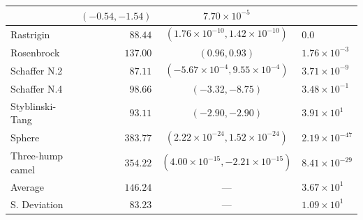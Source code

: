 \begin{longtable}{|l|r|c|l|}
                          & $(-0.54, -1.54)$	
                          & $7.70 \times 10^{-5}$\\\hline
        Rastrigin	        & $88.44$	
                          & $(1.76 \times 10^{-10}, 1.42 \times 10^{-10})$
                          & $0.0$\\\hline
        Rosenbrock	      & $137.00$	
                          & $(0.96, 0.93)$	
                          & $1.76 \times 10^{-3}$\\\hline
        Schaffer N.2	    & $87.11$	
                          & $(-5.67 \times 10^{-4}, 9.55 \times 10^{-4})$	
                          & $3.71 \times 10^{-9}$\\\hline
        Schaffer N.4	    & $98.66$	
                          & $(-3.32, -8.75)$	
                          & $3.48 \times 10^{-1}$\\\hline
        Styblinski-Tang	  & $93.11$	
                          & $(-2.90, -2.90)$	
                          & $3.91 \times 10^1$\\\hline
        Sphere	          & $383.77$	
                          & $(2.22 \times 10^{-24}, 1.52 \times 10^{-24})$	
                          & $2.19 \times 10^{-47}$\\\hline
        Three-hump camel	& $354.22$	
                          & $(4.00 \times 10^{-15}, -2.21 \times 10^{-15})$	
                          & $8.41 \times 10^{-29}$\\\hline
        \hline Average  	& $146.24$	
                          & ---	
                          & $3.67 \times 10^1$\\\hline
        S. Deviation	    & $83.23$	
                          & ---	
                          & $1.09 \times 10^1$\\\hline
      \end{longtable}

